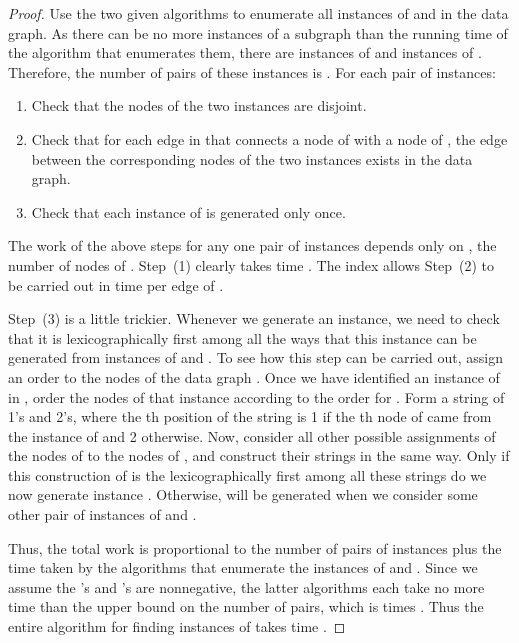 \begin{proof}
Use the two given algorithms to enumerate all instances of  and  in the data graph.
As there can be no more in\-stan\-ces of a subgraph than the running time of the algorithm that enum\-er\-ates them, there are  instances of  and   instances of . Therefore, the number of pairs of these instances is  .  For each pair of instances:

\begin{enumerate}

\item
Check that the nodes of the two instances are disjoint.

\item
Check that for each edge in  that connects a node of  with a node of , the edge between the corresponding nodes of the two instances exists in the data graph.

\item
Check that each instance of  is generated only once.

\end{enumerate}

The work of the above steps for any one pair of instances depends only on , the number of nodes of .  Step~(1) clearly takes time .  The index allows Step~(2) to be carried out in  time per edge of .

Step~(3) is a little trickier.  Whenever we generate an instance, we need to check that it is lexicographically first among all the ways that this instance can be generated from instances of  and .  To see how this step can be carried out, assign an order to the nodes of the data graph .  Once we have identified an instance  of  in , order the nodes of that instance according to the order for .  Form a string of 1's and 2's, where the th position of the string is 1 if the th node of  came from the instance of  and 2 otherwise.  Now, consider all other possible assignments of the nodes of  to the nodes of , and construct their strings in the same way.  Only if this construction of  is the lexicographically first among all these strings do we now generate instance .  Otherwise,  will be generated when we consider some other pair of instances of  and .

Thus, the total work is proportional to the number of pairs of instances plus the time taken by the algorithms that enumerate the instances of  and .  Since we assume the 's and 's are nonnegative, the latter algorithms each take no more time than the upper bound on the number of pairs, which is  times .  Thus the entire algorithm for finding instances of  takes time .
\end{proof}

